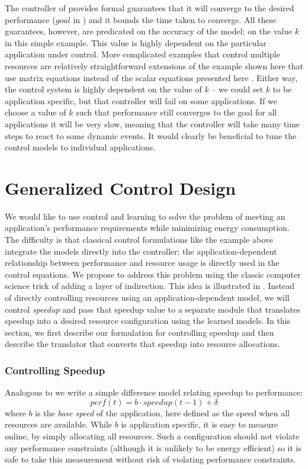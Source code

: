 The controller of  provides formal guarantees
that it will converge to the desired performance ($goal$ in
) and it bounds the time taken to converge.  All
these guarantees, however, are predicated on the accuracy of the
model; \ie on the value $k$ in this simple example.  This value is
highly dependent on the particular application under control.  More
complicated examples that control multiple resources are relatively
straightforward extensions of the example shown here that use matrix
equations instead of the scalar equations presented here
\cite{METE,others}.  Either way, the control system is highly
dependent on the value of $k$ -- we could set $k$ to be
application specific, but that controller will fail on some
applications.  If we choose a value of $k$ such that performance still
converges to the goal for all applications it will be very slow,
meaning that the controller will take many time steps to react to some
dynamic events.  It would clearly be beneficial to tune the control
models to individual applications.

\section{Generalized Control Design}
We would like to use control and learning to solve the problem of
meeting an application's performance requirements while minimizing
energy consumption.  The difficulty is that classical control
formulations like the example above integrate the models directly into
the controller; \ie the application-dependent relationship between
performance and resource usage is directly used in the control
equations.  We propose to address this problem using the classic
computer science trick of adding a layer of indirection.  This idea is
illustrated in .  Instead of directly controlling
resources using an application-dependent model, we will control
\emph{speedup} and pass that speedup value to a separate module that
translates speedup into a desired resource configuration using the
learned models.  In this section, we first describe our formulation
for controlling speedup and then describe the translator that converts
that speedup into resource allocations.

\subsubsection{Controlling Speedup}
Analogous to  we write a simple difference model
relating speedup to performance:
\begin{equation}
  perf(t) = b \cdot speedup(t-1) + \delta \label{eqn:speedup}
\end{equation}
where $b$ is the \emph{base speed} of the application, here defined as
the speed when all resources are available.  While $b$ is application
specific, it is easy to measure online, by simply allocating all
resources. Such a configuration should not violate any performance
constraints (although it is unlikely to be energy efficient) so it is
safe to take this measurement without risk of violating performance
constraints.

